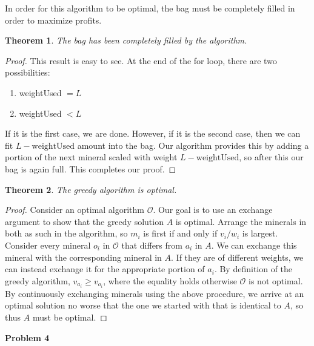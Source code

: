 \documentclass{article}
\newcommand{\Problem}[1]{\textbf{Problem #1}}
\begin{document}
In order for this algorithm to be optimal, the bag must be completely filled in order to maximize profits.
\newtheorem{bag}{Theorem}
\begin{bag}
The bag has been completely filled by the algorithm.
\end{bag}
\begin{proof}
This result is easy to see. 
At the end of the for loop, there are two possibilities: 
\begin{enumerate}
\item weightUsed $ = L$
\item weightUsed $< L$
\end{enumerate}
If it is the first case, we are done.
However, if it is the second case, then we can fit $L - \text{weightUsed}$ amount into the bag.
Our algorithm provides this by adding a portion of the next mineral scaled with weight $L - \text{weightUsed}$, so after this our bag is again full.
This completes our proof.
\end{proof}

\begin{bag}
The greedy algorithm is optimal.
\end{bag}
\begin{proof}
Consider an optimal algorithm $\mathcal{O}$.
Our goal is to use an exchange argument to show that the greedy solution $A$ is optimal.
Arrange the minerals in both as such in the algorithm, so $m_i$ is first if and only if $v_i / w_i$ is largest.
Consider every mineral $o_i$ in $\mathcal{O}$ that differs from $a_i$ in $A$.
We can exchange this mineral with the corresponding mineral in $A$. 
If they are of different weights, we can instead exchange it for the appropriate portion of $a_i$.
By definition of the greedy algorithm, $v_{a_i} \geq v_{o_i}$, where the equality holds otherwise $\mathcal{O}$ is not optimal.
By continuously exchanging minerals using the above procedure, we arrive at an optimal solution no worse that the one we started with that is identical to $A$, so thus $A$ must be optimal.
\end{proof}

\newpage

\Problem{4}
\end{document}
